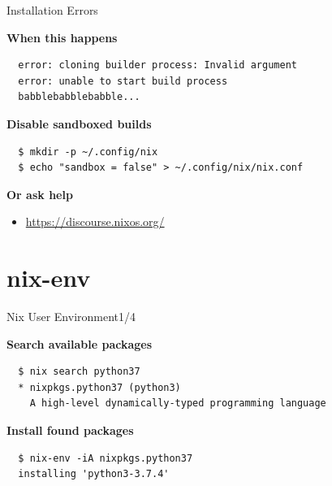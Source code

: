 \documentclass[10pt,aspectratio=169]{beamer}
\begin{document}

\begin{frame}[fragile]{Installation Errors}

  \textbf{When this happens}

  \begin{verbatim}
  error: cloning builder process: Invalid argument
  error: unable to start build process
  babblebabblebabble...
  \end{verbatim}

  \textbf{Disable sandboxed builds}

  \begin{verbatim}
  $ mkdir -p ~/.config/nix
  $ echo "sandbox = false" > ~/.config/nix/nix.conf
  \end{verbatim}

  \textbf{Or ask help}

  \begin{itemize}
    \item \href{https://discourse.nixos.org/}{https://discourse.nixos.org/}
  \end{itemize}

\end{frame}


\section{nix-env}


\begin{frame}[fragile]{Nix User Environment\hfill1/4}

  \textbf{Search available packages}
  \begin{verbatim}
  $ nix search python37
  * nixpkgs.python37 (python3)
    A high-level dynamically-typed programming language
  \end{verbatim}

  \textbf{Install found packages}
  \begin{verbatim}
  $ nix-env -iA nixpkgs.python37
  installing 'python3-3.7.4'
  \end{verbatim}

\end{frame}
\end{document}
